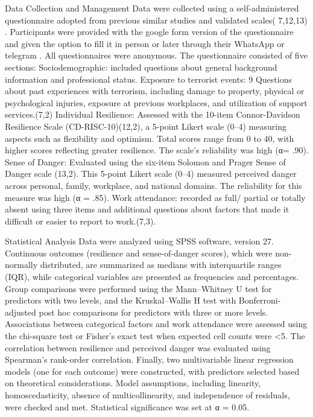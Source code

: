 Data Collection and Management 
Data were collected using a self-administered  questionnaire adopted from previous similar studies and validated scales( 7,12,13)  . Participants  were provided with the google form version of the questionnaire  and given the option to fill it in person or later through their WhatsApp or telegram  . All questionnaires were anonymous. The questionnaire consisted of five sections: 
Sociodemographic: included questions about general background information and professional status.
Exposure to terrorist events: 9 Questions about past experiences with terrorism, including damage to property, physical or psychological injuries, exposure at previous workplaces, and utilization of support services.(7,2)
Individual Resilience: Assessed with the 10-item Connor-Davidson Resilience Scale (CD-RISC-10)(12,2), a  5-point Likert scale (0–4) measuring aspects such as flexibility and optimism. Total scores range from 0 to 40, with higher scores reflecting greater resilience. The scale's reliability was high (α= .90).
Sense of Danger: Evaluated using the six-item Solomon and Prager Sense of Danger scale (13,2). This 5-point Likert scale (0–4) measured perceived danger across personal, family, workplace, and national domains. The reliability for this measure was high (α = .85).
Work attendance: recorded as full/ partial or totally absent using three items and additional questions about factors that made it difficult or easier to report to work.(7,3).

Statistical Analysis
 Data were analyzed using SPSS software, version 27. Continuous outcomes (resilience and sense-of-danger scores), which were non-normally distributed, are summarized as medians with interquartile ranges (IQR), while categorical variables are presented as frequencies and percentages. Group comparisons were performed using the Mann–Whitney U test for predictors with two levels, and the Kruskal–Wallis H test with Bonferroni-adjusted post hoc comparisons for predictors with three or more levels. Associations between categorical factors and work attendance were assessed using the chi-square test or Fisher’s exact test when expected cell counts were <5. The correlation between resilience and perceived danger was evaluated using Spearman’s rank-order correlation. Finally, two multivariable linear regression models (one for each outcome) were constructed, with predictors selected based on theoretical considerations. Model assumptions, including linearity, homoscedasticity, absence of multicollinearity, and independence of residuals, were checked and met. Statistical significance was set at α = 0.05.

